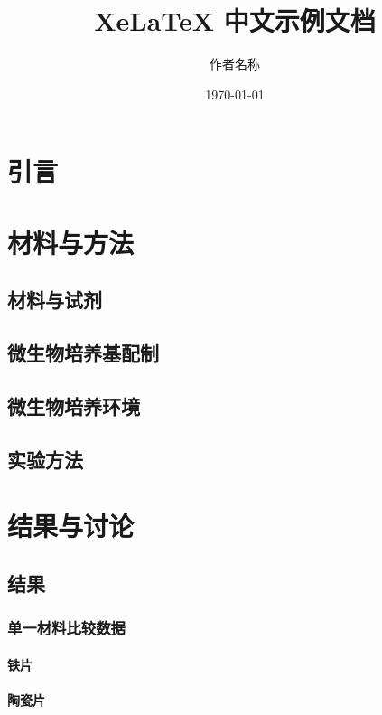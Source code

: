 \documentclass[12pt,a4paper]{article}
\title{XeLaTeX 中文示例文档}
\author{作者名称}
\date{\today}  %
\begin{document}
\maketitle  %

\begin{abstract}

\end{abstract}
\newpage
\makecontent

\newpage

\section{引言}

\section{材料与方法}
\subsection{材料与试剂}

\subsection{微生物培养基配制}

\subsection{微生物培养环境}

\subsection{实验方法}


\section{结果与讨论}
\subsection{结果}
\subsubsection{单一材料比较数据}
\paragraph{铁片}

\paragraph{陶瓷片}
\end{document}
